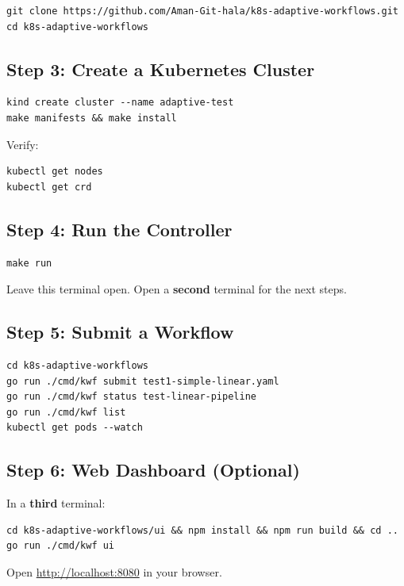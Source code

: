 \documentclass[11pt,a4paper]{article}
\begin{document}
\begin{lstlisting}
git clone https://github.com/Aman-Git-hala/k8s-adaptive-workflows.git
cd k8s-adaptive-workflows
\end{lstlisting}

\subsection{Step 3: Create a Kubernetes Cluster}

\begin{lstlisting}
kind create cluster --name adaptive-test
make manifests && make install
\end{lstlisting}

Verify:
\begin{lstlisting}
kubectl get nodes
kubectl get crd
\end{lstlisting}

\subsection{Step 4: Run the Controller}

\begin{lstlisting}
make run
\end{lstlisting}

Leave this terminal open. Open a \textbf{second} terminal for the next steps.

\subsection{Step 5: Submit a Workflow}

\begin{lstlisting}
cd k8s-adaptive-workflows
go run ./cmd/kwf submit test1-simple-linear.yaml
go run ./cmd/kwf status test-linear-pipeline
go run ./cmd/kwf list
kubectl get pods --watch
\end{lstlisting}

\subsection{Step 6: Web Dashboard (Optional)}

In a \textbf{third} terminal:
\begin{lstlisting}
cd k8s-adaptive-workflows/ui && npm install && npm run build && cd ..
go run ./cmd/kwf ui
\end{lstlisting}

Open \url{http://localhost:8080} in your browser.
\end{document}
